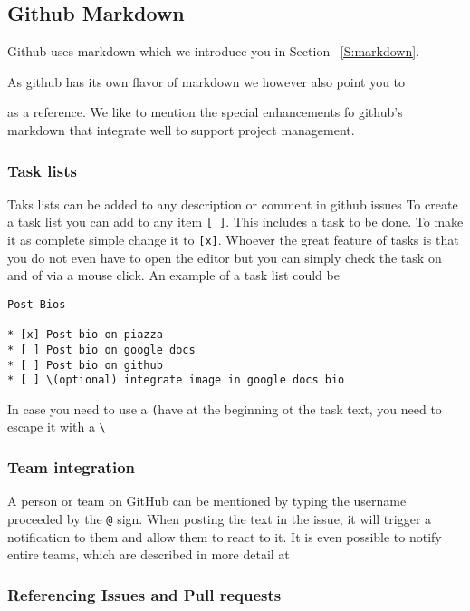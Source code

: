 \subsection{Github Markdown}

Github uses markdown which we introduce you in Section
 ~\ref{S:markdown}.

As github has its own flavor of markdown we however also point you to 

as a reference. We like to mention the special enhancements fo github's
markdown that integrate well to
support project management.



\subsubsection{Task lists}

Taks lists can be added to any description or comment in github issues
To create a task list you can add to any item \verb|[ ]|. This includes a
task to be done. To make it as complete simple change it to
\verb|[x]|. Whoever the great feature of tasks is that you do not even have
to open the editor but you can simply check the task on and of via a
mouse click. An example of a task list could be 

\begin{lstlisting}
Post Bios

* [x] Post bio on piazza
* [ ] Post bio on google docs
* [ ] Post bio on github
* [ ] \(optional) integrate image in google docs bio
\end{lstlisting}

In case you need to use a \verb|(|have at the beginning ot the task
text, you need to escape it with a \verb|\|

\subsubsection{Team integration}

A person or team on GitHub can be mentioned by typing the username
proceeded by the \verb|@| sign. When posting the text in the issue, it
will trigger a notification to them and allow them to react to it. It
is even possible to notify entire teams, which are described in more
detail at 


\subsubsection{Referencing Issues and Pull requests}

